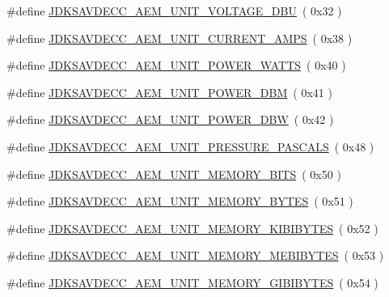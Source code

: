 \begin{DoxyCompactItemize}
\item 
\#define \hyperlink{group__units_ga2590a6d5cc91fee7a48b207094b3492d}{J\+D\+K\+S\+A\+V\+D\+E\+C\+C\+\_\+\+A\+E\+M\+\_\+\+U\+N\+I\+T\+\_\+\+V\+O\+L\+T\+A\+G\+E\+\_\+\+D\+BU}~( 0x32 )
\item 
\#define \hyperlink{group__units_gaacc2dfa0c291803623740528d1fc1fd9}{J\+D\+K\+S\+A\+V\+D\+E\+C\+C\+\_\+\+A\+E\+M\+\_\+\+U\+N\+I\+T\+\_\+\+C\+U\+R\+R\+E\+N\+T\+\_\+\+A\+M\+PS}~( 0x38 )
\item 
\#define \hyperlink{group__units_gaeff6eb968481c1891ebc5e69534a8318}{J\+D\+K\+S\+A\+V\+D\+E\+C\+C\+\_\+\+A\+E\+M\+\_\+\+U\+N\+I\+T\+\_\+\+P\+O\+W\+E\+R\+\_\+\+W\+A\+T\+TS}~( 0x40 )
\item 
\#define \hyperlink{group__units_ga950d3e4aceb42cafda98b0e4ded0e28c}{J\+D\+K\+S\+A\+V\+D\+E\+C\+C\+\_\+\+A\+E\+M\+\_\+\+U\+N\+I\+T\+\_\+\+P\+O\+W\+E\+R\+\_\+\+D\+BM}~( 0x41 )
\item 
\#define \hyperlink{group__units_ga467509717bbe3efac22c13207c929584}{J\+D\+K\+S\+A\+V\+D\+E\+C\+C\+\_\+\+A\+E\+M\+\_\+\+U\+N\+I\+T\+\_\+\+P\+O\+W\+E\+R\+\_\+\+D\+BW}~( 0x42 )
\item 
\#define \hyperlink{group__units_ga5b4fe88405c35b78b6725b68130de7ef}{J\+D\+K\+S\+A\+V\+D\+E\+C\+C\+\_\+\+A\+E\+M\+\_\+\+U\+N\+I\+T\+\_\+\+P\+R\+E\+S\+S\+U\+R\+E\+\_\+\+P\+A\+S\+C\+A\+LS}~( 0x48 )
\item 
\#define \hyperlink{group__units_gaa639613b8124376c95fb87880b2479e7}{J\+D\+K\+S\+A\+V\+D\+E\+C\+C\+\_\+\+A\+E\+M\+\_\+\+U\+N\+I\+T\+\_\+\+M\+E\+M\+O\+R\+Y\+\_\+\+B\+I\+TS}~( 0x50 )
\item 
\#define \hyperlink{group__units_gae74dae0a228f38b450c31a5375283dcb}{J\+D\+K\+S\+A\+V\+D\+E\+C\+C\+\_\+\+A\+E\+M\+\_\+\+U\+N\+I\+T\+\_\+\+M\+E\+M\+O\+R\+Y\+\_\+\+B\+Y\+T\+ES}~( 0x51 )
\item 
\#define \hyperlink{group__units_ga948b082ea07b68f262be771f992b84d9}{J\+D\+K\+S\+A\+V\+D\+E\+C\+C\+\_\+\+A\+E\+M\+\_\+\+U\+N\+I\+T\+\_\+\+M\+E\+M\+O\+R\+Y\+\_\+\+K\+I\+B\+I\+B\+Y\+T\+ES}~( 0x52 )
\item 
\#define \hyperlink{group__units_ga588d873698f33e588547fe398bd5c0d1}{J\+D\+K\+S\+A\+V\+D\+E\+C\+C\+\_\+\+A\+E\+M\+\_\+\+U\+N\+I\+T\+\_\+\+M\+E\+M\+O\+R\+Y\+\_\+\+M\+E\+B\+I\+B\+Y\+T\+ES}~( 0x53 )
\item 
\#define \hyperlink{group__units_ga083a60e8e5acbb332effd81db7f93cf4}{J\+D\+K\+S\+A\+V\+D\+E\+C\+C\+\_\+\+A\+E\+M\+\_\+\+U\+N\+I\+T\+\_\+\+M\+E\+M\+O\+R\+Y\+\_\+\+G\+I\+B\+I\+B\+Y\+T\+ES}~( 0x54 )
\item 

\end{DoxyCompactItemize}
